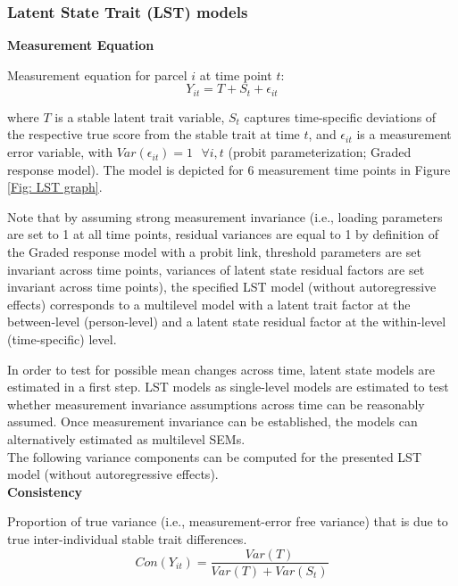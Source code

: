 

\subsubsection{Latent State Trait (LST) models}

\textbf{Measurement Equation}

Measurement equation for parcel $i$ at time point $t$:
\begin{equation}
Y_{it}= T+ S_t + \epsilon_{it}
\end{equation}

where $T$ is a stable latent trait variable, $S_t$ captures time-specific deviations of the respective true score from the stable trait at time $t$, and $\epsilon_{it}$ is a measurement error variable,  with $Var(\epsilon_{it})=1 ~~~\forall i,t$ (probit parameterization; Graded response model). The model is depicted for 6 measurement time points in Figure \ref{Fig: LST graph}.  

Note that by assuming strong measurement invariance (i.e., loading parameters are set to 1 at all time points, residual variances are equal to 1 by definition of the Graded response model with a probit link, threshold parameters are set invariant across time points, variances of latent state residual factors are set invariant across time points), the specified LST model (without autoregressive effects) corresponds to a multilevel model with a latent trait factor at the between-level (person-level) and a latent state residual factor at the within-level (time-specific) level.

 In order to test for possible mean changes across time, latent state models are estimated in a first step. LST models as single-level models are estimated to test whether measurement invariance assumptions across time can be reasonably assumed. Once measurement invariance can be established, the models can alternatively estimated as multilevel SEMs. \\

The following variance components can be computed for the presented LST model (without autoregressive effects). \\



\textbf{Consistency}

Proportion of true variance (i.e., measurement-error free variance) that is due to true inter-individual stable trait differences.
\begin{equation}
Con(Y_{it})=\frac{Var(T)}{Var(T)+Var(S_t)}
\end{equation}

